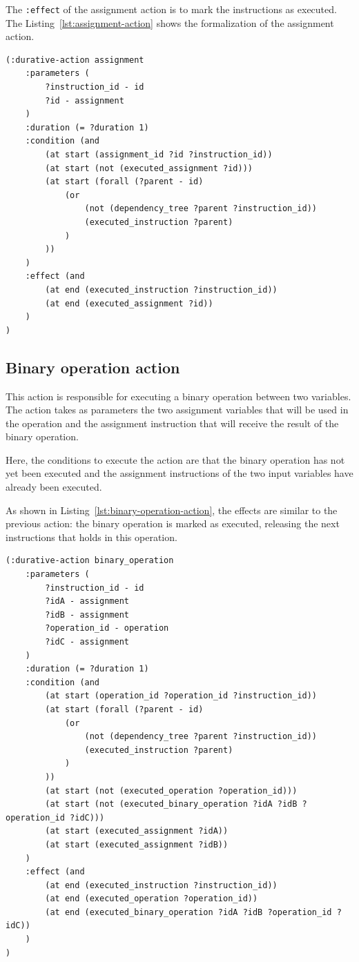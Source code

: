 \documentclass[letterpaper]{article}
\begin{document}
The \texttt{:effect} of the assignment action is to mark the instructions as executed. The Listing~\ref{lst:assignment-action} shows the formalization of the assignment action.

\begin{lstlisting}[caption=Formalization of the assignment action,label=lst:assignment-action,style=pddlStyle]
(:durative-action assignment
    :parameters (
        ?instruction_id - id
        ?id - assignment
    )
    :duration (= ?duration 1)
    :condition (and
        (at start (assignment_id ?id ?instruction_id))
        (at start (not (executed_assignment ?id)))
        (at start (forall (?parent - id)
            (or
                (not (dependency_tree ?parent ?instruction_id))
                (executed_instruction ?parent)
            )
        ))
    )
    :effect (and
        (at end (executed_instruction ?instruction_id))
        (at end (executed_assignment ?id))
    )
)
\end{lstlisting}

\subsection{Binary operation action}

This action is responsible for executing a binary operation between two variables. The action takes as parameters the two assignment variables that will be used in the operation and the assignment instruction that will receive the result of the binary operation.

Here, the conditions to execute the action are that the binary operation has not yet been executed and the assignment instructions of the two input variables have already been executed.

As shown in Listing~\ref{lst:binary-operation-action}, the effects are similar to the previous action: the binary operation is marked as executed, releasing the next instructions that holds in this operation.

\begin{lstlisting}[caption=Formalization of the binary operation action,label=lst:binary-operation-action,style=pddlStyle]
(:durative-action binary_operation
    :parameters (
        ?instruction_id - id
        ?idA - assignment
        ?idB - assignment
        ?operation_id - operation
        ?idC - assignment
    )
    :duration (= ?duration 1)
    :condition (and
        (at start (operation_id ?operation_id ?instruction_id))
        (at start (forall (?parent - id)
            (or
                (not (dependency_tree ?parent ?instruction_id))
                (executed_instruction ?parent)
            )
        ))
        (at start (not (executed_operation ?operation_id)))
        (at start (not (executed_binary_operation ?idA ?idB ?operation_id ?idC)))
        (at start (executed_assignment ?idA))
        (at start (executed_assignment ?idB))
    )
    :effect (and
        (at end (executed_instruction ?instruction_id))
        (at end (executed_operation ?operation_id))
        (at end (executed_binary_operation ?idA ?idB ?operation_id ?idC))
    )
)
\end{lstlisting}
\end{document}
